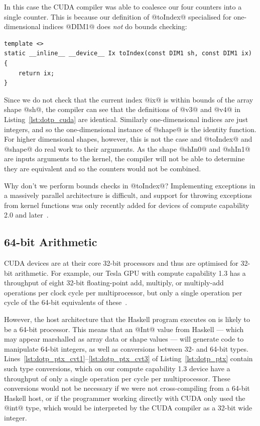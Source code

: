In this case the CUDA compiler was able to coalesce our four counters into a
single counter. This is because our definition of @toIndex@ specialised for
one-dimensional indices @DIM1@ does \emph{not} do bounds checking:
%
\begin{lstlisting}[style=cuda]
template <>
static __inline__ __device__ Ix toIndex(const DIM1 sh, const DIM1 ix)
{
    return ix;
}
\end{lstlisting}
%
Since we do not check that the current index @ix@ is within bounds of the
array shape @sh@, the compiler can see that the definitions of @v3@
and @v4@ in Listing~\ref{lst:dotp_cuda} are identical. Similarly
one-dimensional indices are just integers, and so the one-dimensional instance
of @shape@ is the identity function. For higher dimensional shapes,
however, this is not the case and @toIndex@ and @shape@ do real work
to their arguments. As the shape @shIn0@ and @shIn1@ are inputs
arguments to the kernel, the compiler will not be able to determine they are
equivalent and so the counters would not be combined.

Why don't we perform bounds checks in @toIndex@? Implementing exceptions in
a massively parallel architecture is difficult, and support for throwing
exceptions from kernel functions was only recently added for devices of compute
capability 2.0 and later~\cite{NVIDIA:2012wf}. %


\subsection{64-bit Arithmetic}

CUDA devices are at their core 32-bit processors and thus are optimised for
32-bit arithmetic. For example, our Tesla GPU with compute capability 1.3 has a
throughput of eight 32-bit floating-point add, multiply, or multiply-add
operations per clock cycle per multiprocessor, but only a single operation per
cycle of the 64-bit equivalents of these~\cite{NVIDIA:2012wf}. %

However, the host architecture that the Haskell program executes on is likely to
be a 64-bit processor. This means that an @Int@ value from Haskell ---
which may appear marshalled as array data or shape values --- will generate code
to manipulate 64-bit integers, as well as conversions between 32- and 64-bit
types. Lines~\ref{lst:dotp_ptx_cvt1}--\ref{lst:dotp_ptx_cvt3} of
Listing~\ref{lst:dotp_ptx} contain such type conversions, which on our compute
capability 1.3 device have a throughput of only a single operation per cycle per
multiprocessor. These conversions would not be necessary if we were not
cross-compiling from a 64-bit Haskell host, or if the programmer working
directly with CUDA only used the @int@ type, which would be interpreted by
the CUDA compiler as a 32-bit wide integer.


